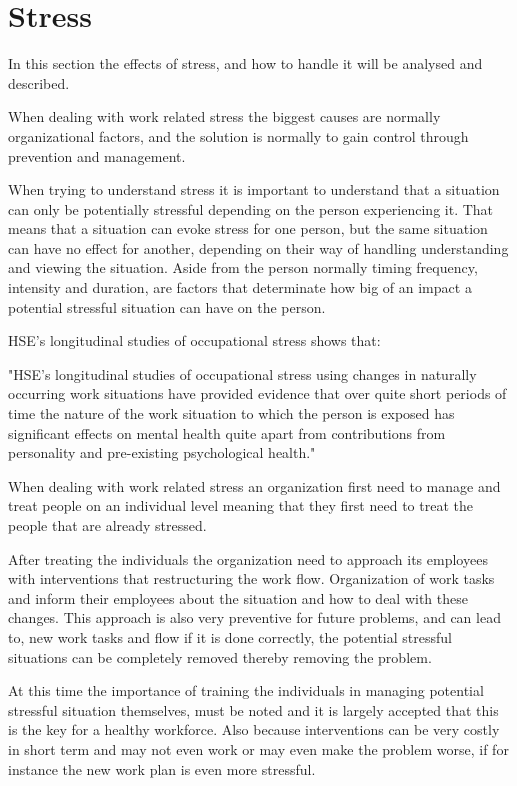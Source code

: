 \section{Stress}
In this section the effects of stress, and how to handle it will be analysed and described.

When dealing with work related stress the biggest causes are normally organizational factors, and the solution is normally to gain control through prevention and management.

When trying to understand stress it is important to understand that a situation can only be potentially stressful depending on the person experiencing it. That means that a situation can evoke stress for one person, but the same situation can have no effect for another, depending on their way of handling understanding and viewing the situation. Aside from the person normally timing frequency, intensity and duration, are factors that determinate how big of an impact a potential stressful situation can have on the person.

HSE's longitudinal studies of occupational stress shows that:

"HSE's longitudinal studies of occupational stress using changes in naturally occurring work situations have provided evidence that over quite short periods of time the nature of the work situation to which the person is exposed has significant effects on mental health quite apart from contributions from personality and pre-existing psychological health."

When dealing with work related stress an organization first need to manage and treat people on an individual level meaning that they first need to treat the people that are already stressed\cite{control_stress_work}.

After treating the individuals the organization need to approach its employees with interventions that restructuring the work flow. Organization of work tasks and inform their employees about the situation and how to deal with these changes. This approach is also very preventive for future problems, and can lead to, new work tasks and flow if it is done correctly, the potential stressful situations can be completely removed thereby removing the problem.

At this time the importance of training the individuals in managing potential stressful situation themselves, must be noted and it is largely accepted that this is the key for a healthy workforce. Also because interventions can be very costly in short term and may not even work or may even make the problem worse, if for instance the new work plan is even more stressful.

